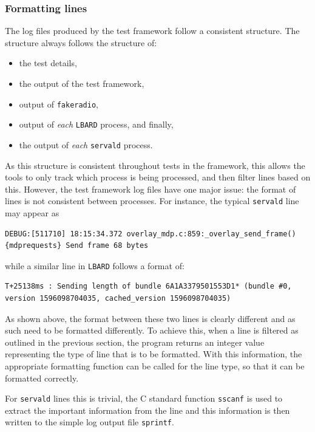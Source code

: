 \subsubsection{Formatting lines}
The log files produced by the test framework follow a consistent structure.
The structure always follows the structure of:
\begin{itemize}
    \item the test details, 
    \item the output of the test framework, 
    \item output of \texttt{fakeradio}, 
    \item output of \emph{each} \texttt{LBARD} process, and finally,
    \item the output of \emph{each} \texttt{servald} process.
\end{itemize} 

As this structure is consistent throughout tests in the framework, this allows the tools to only track which process is being processed, and then filter lines based on this.
However, the test framework log files have one major issue: the format of lines is not consistent between processes.
For instance, the typical \texttt{servald} line may appear as
\begin{center}
    \begin{lstlisting}[basicstyle=\small, breaklines]
DEBUG:[511710] 18:15:34.372 overlay_mdp.c:859:_overlay_send_frame() {mdprequests} Send frame 68 bytes    
    \end{lstlisting}
\end{center}
while a similar line in \texttt{LBARD} follows a format of:
\begin{center}
    \begin{lstlisting}[basicstyle=\small, breaklines]
T+25138ms : Sending length of bundle 6A1A3379501553D1* (bundle #0, version 1596098704035, cached_version 1596098704035)
    \end{lstlisting}
\end{center}

As shown above, the format between these two lines is clearly different and as such need to be formatted differently.
To achieve this, when a line is filtered as outlined in the previous section, the program returns an integer value representing the type of line that is to be formatted.
With this information, the appropriate formatting function can be called for the line type, so that it can be formatted correctly.

For \texttt{servald} lines this is trivial, the C standard function \texttt{sscanf} is used to extract the important information from the line and this information is then written to the simple log output file \texttt{sprintf}.

